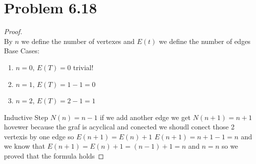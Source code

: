 \documentclass[12pt]{article}
\begin{document}
\section*{Problem 6.18}
\begin{proof} \noindent \\
By $n$  we define the number of vertexes and $E(t)$ we define the number of edges
Base Cases:
\begin{enumerate}[label=\arabic*)]
	\item $n=0$, $E(T)=0$ trivial!
	\item $n=1$, $E(T)=1-1=0$
	\item $n=2$, $E(T)=2-1=1$
\end{enumerate}
Inductive Step
$N(n)=n-1$ if we add another edge we get $N(n+1)=n+1$ hovewer because the graf is acyclical and conected we shoudl conect those 2 vertexis by one edge so $E(n+1)=E(n)+1$
$E(n+1)=n+1-1=n$ and we know that $E(n+1)=E(n)+1=(n-1)+1=n$ and $n=n$ so we proved that the formula holds
\end{proof}
\end{document}
